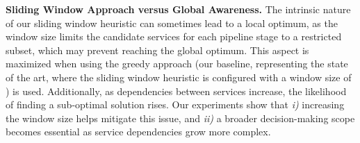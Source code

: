 {    \vspace{0.5em}
    
    \noindent\textbf{Sliding Window Approach versus Global Awareness.} The intrinsic nature of our sliding window heuristic can sometimes lead to a local optimum, as the window size limits the candidate services for each pipeline stage to a restricted subset, which may prevent reaching the global optimum. This aspect is maximized when using the greedy approach (our baseline,  representing the state of the art, where the sliding window heuristic is configured with a window size of ) is used. Additionally, as dependencies between services increase, the likelihood of finding a sub-optimal solution rises. Our experiments show that \emph{i)} increasing the window size helps mitigate this issue, and \emph{ii)} a broader decision-making scope becomes essential as service dependencies grow more complex.
}
